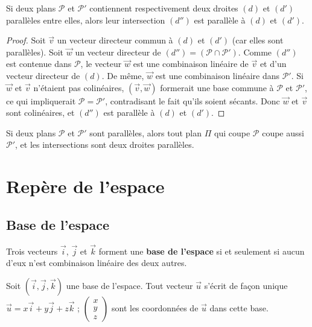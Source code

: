 \documentclass[11pt,a4paper,openany]{book}
\theoremstyle{definition}
\newcommand{\vc}[1]{\overrightarrow{#1}}
\begin{document}
    \begin{Théorème}
        Si deux plans $\mathcal{P}$ et $\mathcal{P}'$ contiennent respectivement deux droites
        $(d)$ et $(d')$ parallèles entre elles, alors leur intersection $(d'')$ est parallèle
        à $(d)$ et $(d')$.
    \end{Théorème}
    \begin{proof}
        Soit $\vc{v}$ un vecteur directeur commun à $(d)$ et $(d')$ (car elles sont parallèles).
        Soit $\vc{w}$ un vecteur directeur de $(d'')=({\mathcal{P}\cap\mathcal{P}'})$.
        Comme $(d'')$ est contenue dans $\mathcal{P}$, le vecteur $\vc{w}$ est une combinaison
        linéaire de $\vc{v}$ et d'un vecteur directeur de $(d)$.
        De même, $\vc{w}$ est une combinaison linéaire dans $\mathcal{P}'$.
        Si $\vc{w}$ et $\vc{v}$ n'étaient pas colinéaires, $(\vc{v},\vc{w})$ formerait une
        base commune à $\mathcal{P}$ et $\mathcal{P}'$, ce qui impliquerait $\mathcal{P}=\mathcal{P}'$,
        contradisant le fait qu'ils soient sécants. Donc $\vc{w}$ et $\vc{v}$ sont colinéaires,
        et $(d'')$ est parallèle à $(d)$ et $(d')$.
    \end{proof}

    \begin{Théorème}
        Si deux plans $\mathcal{P}$ et $\mathcal{P}'$ sont parallèles, alors tout plan $\Pi$
        qui coupe $\mathcal{P}$ coupe aussi $\mathcal{P}'$, et les intersections sont deux
        droites parallèles.
    \end{Théorème}

    \section{Repère de l'espace}
    \subsection{Base de l'espace}
    \begin{Définition}
        Trois vecteurs $\vc{i}$, $\vc{j}$ et $\vc{k}$ forment une \textbf{base de l'espace}
        si et seulement si aucun d'eux n'est combinaison linéaire des deux autres.
    \end{Définition}

    \begin{Propriété}
        Soit $(\vc{i},\vc{j},\vc{k})$ une base de l'espace. Tout vecteur $\vc{u}$ s'écrit
        de façon unique $\vc{u}=x\vc{i}+y\vc{j}+z\vc{k}$ ;
        $\left(\begin{smallmatrix}x\\y\\z\end{smallmatrix}\right)$ sont les coordonnées de
        $\vc{u}$ dans cette base.
    \end{Propriété}
\end{document}
